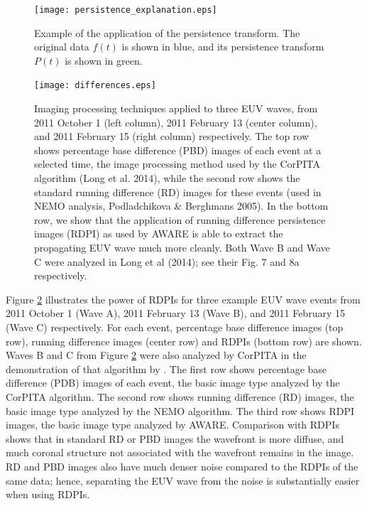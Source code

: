 \begin{figure}
\begin{center}
\texttt{[image: persistence\_explanation.eps]}
\caption{Example of the application of the persistence transform.  The
original data $f(t)$ is shown in blue, and its persistence transform
$P(t)$ is shown in green.}
\label{fig:persistence}
\end{center}
\end{figure}

\begin{figure}
\begin{center}
\texttt{[image: differences.eps]}
\caption{Imaging processing techniques applied to three EUV waves,
  from 2011 October 1 (left column), 2011 February 13 (center column),
  and 2011 February 15 (right column) respectively. The top row shows
  percentage base difference (PBD) images of each event at a selected
  time, the image processing method used by the CorPITA algorithm
  (Long et al. 2014), while the second row shows the standard running
  difference (RD) images for these events (used in NEMO analysis,
  Podladchikova & Berghmans 2005). In the bottom row, we show that the
  application of running difference persistence images (RDPI) as used
  by AWARE is able to extract the propagating EUV wave much more
  cleanly. Both Wave B and Wave C were analyzed in Long et al (2014);
  see their Fig. 7 and 8a respectively.}
\label{rpdm_figure}
\end{center}
\end{figure}


Figure \ref{rpdm_figure} illustrates the power of RDPIs for three
example EUV wave events from 2011 October 1 (Wave A), 2011 February 13
(Wave B), and 2011 February 15 (Wave C) respectively. For each event,
percentage base difference images (top row), running difference images
(center row) and RDPIs (bottom row) are shown. Waves B and C from
Figure \ref{rpdm_figure} were also analyzed by CorPITA in the
demonstration of that algorithm by \citet{2014SoPh..289.3279L}.  The
first row shows percentage base difference (PDB) images of each event,
the basic image type analyzed by the CorPITA algorithm.  The second
row shows running difference (RD) images, the basic image type
analyzed by the NEMO algorithm.  The third row shows RDPI images, the
basic image type analyzed by AWARE. Comparison with RDPIs shows that
in standard RD or PBD images the wavefront is more diffuse, and much
coronal structure not associated with the wavefront remains in the
image. RD and PBD images also have much denser noise compared to the
RDPIs of the same data; hence, separating the EUV wave from the noise
is substantially easier when using RDPIs.

